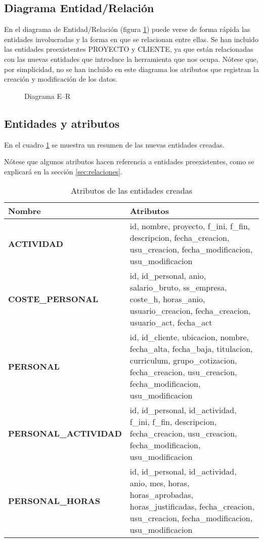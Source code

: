 \subsection{Diagrama Entidad/Relación}

En el diagrama de Entidad/Relación (figura \ref{fig:ERD}) puede verse de forma
rápida las entidades involucradas y la forma en que se relacionan entre ellas.
Se han incluido las entidades preexistentes PROYECTO y CLIENTE, ya que
están relacionadas con las nuevas entidades que introduce la herramienta que nos
ocupa. Nótese que, por simplicidad, no se han incluido en este diagrama los
atributos que registran la creación y modificación de los datos.

\begin{figure}
\centering
{}
\caption{Diagrama E--R}
\label{fig:ERD}
\end{figure}

\subsection{Entidades y atributos}

En el cuadro \ref{tab:tablas_atributos} se muestra un resumen de las nuevas
entidades creadas.

Nótese que algunos atributos hacen referencia a entidades preexistentes, como se
explicará en la sección \ref{sec:relaciones}.

\begin{table}
\small
\centering
\begin{tabular}{|l|p{3in}|}\hline
\textbf{Nombre} & \textbf{Atributos}\\\hline\hline
\textbf{ACTIVIDAD} & id, nombre,
    proyecto, f\_ini, f\_fin, descripcion, fecha\_creacion, usu\_creacion,
    fecha\_modificacion, usu\_modificacion\\\hline
\textbf{COSTE\_PERSONAL} & id, id\_personal, anio, salario\_bruto, ss\_empresa,
    coste\_h, horas\_anio, usuario\_creacion, fecha\_creacion, usuario\_act,
    fecha\_act\\\hline
\textbf{PERSONAL} & id, id\_cliente, ubicacion, nombre, fecha\_alta,
    fecha\_baja,    titulacion, curriculum, grupo\_cotizacion, fecha\_creacion,
    usu\_creacion,    fecha\_modificacion, usu\_modificacion \\\hline
\textbf{PERSONAL\_ACTIVIDAD} & id, id\_personal, id\_actividad, f\_ini, f\_fin,
    descripcion, fecha\_creacion, usu\_creacion, fecha\_modificacion,
    usu\_modificacion \\\hline
\textbf{PERSONAL\_HORAS} & id, id\_personal, id\_actividad, anio, mes, horas,
    horas\_aprobadas, horas\_justificadas, fecha\_creacion, usu\_creacion,
    fecha\_modificacion, usu\_modificacion \\\hline
\end{tabular}
\caption{Atributos de las entidades creadas}
\label{tab:tablas_atributos}
\end{table}

